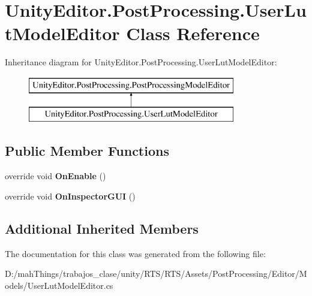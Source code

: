 \hypertarget{class_unity_editor_1_1_post_processing_1_1_user_lut_model_editor}{}\section{Unity\+Editor.\+Post\+Processing.\+User\+Lut\+Model\+Editor Class Reference}
\label{class_unity_editor_1_1_post_processing_1_1_user_lut_model_editor}
Inheritance diagram for Unity\+Editor.\+Post\+Processing.\+User\+Lut\+Model\+Editor\+:\begin{figure}[H]
\begin{center}
\leavevmode
\includegraphics[height=2.000000cm]{class_unity_editor_1_1_post_processing_1_1_user_lut_model_editor}
\end{center}
\end{figure}
\subsection*{Public Member Functions}
\begin{DoxyCompactItemize}
\item 
\mbox{\label{class_unity_editor_1_1_post_processing_1_1_user_lut_model_editor_af7261e180a19f86a6379cd13d76fec2e}} 
override void {\bfseries On\+Enable} ()
\item 
\mbox{\label{class_unity_editor_1_1_post_processing_1_1_user_lut_model_editor_aebca737810782e9837ddd81529ac8542}} 
override void {\bfseries On\+Inspector\+G\+UI} ()
\end{DoxyCompactItemize}
\subsection*{Additional Inherited Members}


The documentation for this class was generated from the following file\+:\begin{DoxyCompactItemize}
\item 
D\+:/mah\+Things/trabajos\+\_\+clase/unity/\+R\+T\+S/\+R\+T\+S/\+Assets/\+Post\+Processing/\+Editor/\+Models/User\+Lut\+Model\+Editor.\+cs\end{DoxyCompactItemize}
